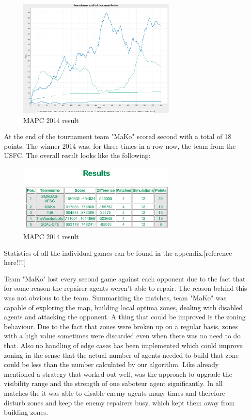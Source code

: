 \begin{figure}[h]
	\centering
	\includegraphics[width=300px]{images/ZonesScoresAndAchievementPoints.png}
	\caption{MAPC 2014 result}
	\label{dis:ZonesScoresAndAchievementPoints}
\end{figure}
At the end of the tournament team "MaKo" scored second with a total of 18 points. The winner 2014 was, for three times in a row now, the team from the USFC. The overall result looks like the following:
\begin{figure}[h]
	\centering
	\includegraphics[width=300px]{images/con_result.png}
	\caption{MAPC 2014 result}
	\label{dis:result}
\end{figure}
Statistics of all the individual games can be found in the appendix.[reference here!!!!]

Team "MaKo" lost every second game against each opponent due to the fact that for some reason the repairer agents weren't able to repair. The reason behind this was not obvious to the team. Summarizing the matches, team "MaKo" was capable of exploring the map, building local optima zones, dealing with disabled agents and attacking the opponent. A thing that could be improved is the zoning behaviour. Due to the fact that zones were broken up on a regular basis, zones with a high value sometimes were discarded even when there was no need to do that. Also no handling of edge cases has been implemented which could improve zoning in the sense that the actual number of agents needed to build that zone could be less than the number calculated by our algorithm. Like already mentioned a strategy that worked out well, was the approach to upgrade the visibility range and the strength of one saboteur agent significantly. In all matches the it was able to disable enemy agents many times and therefore disturb zones and keep the enemy repairers busy, which kept them away from building zones. 


